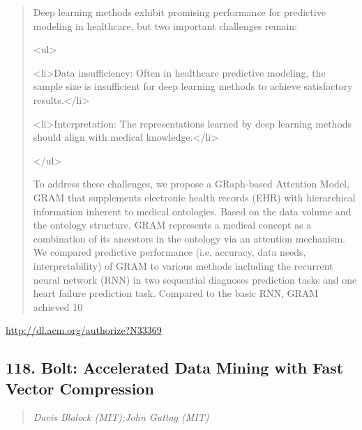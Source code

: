 \documentclass{article}
\begin{document}
\begin{quote}
Deep learning methods exhibit promising performance for predictive modeling in healthcare, but two important challenges remain:

<ul>

    <li>Data insufficiency: Often in healthcare predictive modeling, the sample size is insufficient for deep learning methods to achieve satisfactory results.</li>

    <li>Interpretation: The representations learned by deep learning methods should align with medical knowledge.</li>

</ul>





  To address these challenges, we propose a GRaph-based Attention Model, GRAM that supplements electronic health records (EHR) with hierarchical information inherent to medical ontologies. Based on the data volume and the ontology structure, GRAM represents a medical concept as a combination of its ancestors in the ontology via an attention mechanism. We compared predictive performance (i.e. accuracy, data needs, interpretability) of GRAM to various methods including the recurrent neural network (RNN) in two sequential diagnoses prediction tasks and one heart failure prediction task. Compared to the basic RNN, GRAM achieved 10%
\end{quote}

\href{http://dl.acm.org/authorize?N33369}{http://dl.acm.org/authorize?N33369}

\subsection{118. Bolt: Accelerated Data Mining with Fast Vector Compression}

\begin{quote}
\footnotesize{\textit{Davis Blalock (MIT);John Guttag (MIT)}}

\end{quote}
\end{document}
